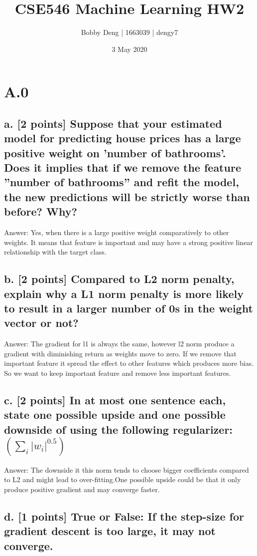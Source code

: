 \documentclass{article}
\title{CSE546 Machine Learning HW2}
\author{Bobby Deng | 1663039 | dengy7 }
\date{3 May 2020}
\begin{document}
	\maketitle


\section*{A.0}

\subsection*{a. [2 points] Suppose that your estimated model for predicting house prices has a large positive weight on	’number of bathrooms’. Does it implies that if we remove the feature ”number of bathrooms” and refit	the model, the new predictions will be strictly worse than before? Why?}

Answer:  Yes, when there is a large positive weight comparatively to other weights. It means that feature is important and may have a strong positive linear relationship with the target class. 

\subsection*{b. [2 points] Compared to L2 norm penalty, explain why a L1 norm penalty is more likely to result in a larger number of 0s in the weight vector or not?}

Answer:  The gradient for l1 is always the same, however l2 norm produce a gradient with diminishing return as weights move to zero. If we remove that important feature it spread the effect to other features which produces more bias. So we want to keep important feature and remove less important features.


\subsection*{c. [2 points] In at most one sentence each, state one possible upside and one possible downside of using the following regularizer: $ (\sum_{i} |w_i|^{0.5}) $ }

Answer: The downside it this norm tends to choose bigger coefficients compared to L2 and might lead to over-fitting.One possible upside could be that it only produce positive gradient and may converge faster.

\subsection*{d. [1 points] True or False: If the step-size for gradient descent is too large, it may not converge.}
\end{document}
